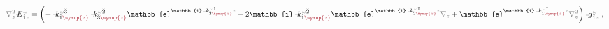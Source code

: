 \begin{align} \label{eq:matrix_exp-ddz}
	\mathcolor{gray}{\nabla_z^2} \xint{\mathcolor{gray}{-}}{30}{E}^{\;\!\mathcolor{gray}{\omega}}_{\;\! \hat{1} \mathcolor{gray}{z}} = \left( - \xint{\begin{smallmatrix} ~ \\ {}^{}_{\mathcolor{gray}{-}} \\ ~ \end{smallmatrix}}{15}{k}_{\hat{1} \textcolor{Maroon}{\symup{z}}}^{\;\! \mathcolor{gray}{\omega} \breve{3}} \xint{\begin{smallmatrix} ~ \\ {}^{}_{\mathcolor{gray}{-}} \\ ~ \end{smallmatrix}}{15}{k}_{\breve{3} \textcolor{Maroon}{\symup{z}}}^{\;\! \mathcolor{gray}{\omega} \breve{2}} \mathbb{e}^{\mathbb{i} \xint{\begin{smallmatrix} ~ \\ {}^{}_{\mathcolor{gray}{-}} \\ ~ \end{smallmatrix}}{15}{k}_{\breve{2} \textcolor{Maroon}{\symup{z}}}^{\;\! \mathcolor{gray}{\omega} \breve{1}} \mathcolor{gray}{z}} + 2 \mathbb{i} \xint{\begin{smallmatrix} ~ \\ {}^{}_{\mathcolor{gray}{-}} \\ ~ \end{smallmatrix}}{15}{k}_{\hat{1} \textcolor{Maroon}{\symup{z}}}^{\;\! \mathcolor{gray}{\omega} \breve{2}} \mathbb{e}^{\mathbb{i} \xint{\begin{smallmatrix} ~ \\ {}^{}_{\mathcolor{gray}{-}} \\ ~ \end{smallmatrix}}{15}{k}_{\breve{2} \textcolor{Maroon}{\symup{z}}}^{\;\! \mathcolor{gray}{\omega} \breve{1}} \mathcolor{gray}{z}} \mathcolor{gray}{\nabla_z} + \mathbb{e}^{\mathbb{i} \xint{\begin{smallmatrix} ~ \\ {}^{}_{\mathcolor{gray}{-}} \\ ~ \end{smallmatrix}}{15}{k}_{\hat{1} \textcolor{Maroon}{\symup{z}}}^{\;\! \mathcolor{gray}{\omega} \breve{1}} \mathcolor{gray}{z}} \mathcolor{gray}{\nabla_z^2} \right) \xint{{}^{}_{\mathcolor{gray}{-}}}{10}{g}^{\;\!\mathcolor{gray}{\omega}}_{\;\! \breve{1} \mathcolor{gray}{z}} ~,
\end{align}
